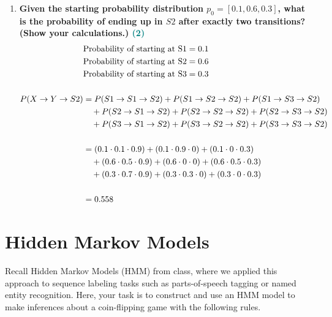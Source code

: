 \documentclass[a4paper]{article}
\begin{document}
\begin{sloppypar}
\begin{enumerate}[start=1,label=Q\arabic*,left=0pt]
    \item \textbf{Given the starting probability distribution $p_0 = [0.1, 0.6, 0.3]$, what is the probability of ending up in $S2$ after exactly two transitions? (Show your calculations.) \hfill \textcolor{teal}{(2)}}
    \begin{align*}
        & \hfill \text{Probability of starting at S1} \hfill = 0.1 \\
        & \hfill \text{Probability of starting at S2} \hfill = 0.6 \\
        & \hfill \text{Probability of starting at S3} \hfill = 0.3 \\\\
        P(X \rightarrow Y \rightarrow S2) &= P(S1 \rightarrow S1 \rightarrow S2) + P(S1 \rightarrow S2 \rightarrow S2) + P(S1 \rightarrow S3 \rightarrow S2) \\
        &\quad + P(S2 \rightarrow S1 \rightarrow S2) + P(S2 \rightarrow S2 \rightarrow S2) + P(S2 \rightarrow S3 \rightarrow S2) \\
        &\quad + P(S3 \rightarrow S1 \rightarrow S2) + P(S3 \rightarrow S2 \rightarrow S2) + P(S3 \rightarrow S3 \rightarrow S2) \\\\
        &= (0.1 \cdot 0.1 \cdot 0.9) + (0.1 \cdot  0.9 \cdot 0) + (0.1 \cdot 0 \cdot 0.3) \\
        &\quad + (0.6 \cdot 0.5 \cdot 0.9) + (0.6 \cdot 0 \cdot  0) + (0.6 \cdot 0.5 \cdot 0.3) \\
        &\quad + (0.3 \cdot 0.7 \cdot 0.9) + (0.3 \cdot 0.3 \cdot 0) + (0.3 \cdot 0 \cdot 0.3) \\\\
        &= 0.558
    \end{align*}

\end{enumerate}

\section{Hidden Markov Models}

Recall Hidden Markov Models (HMM) from class, where we applied this approach to sequence 
labeling tasks such as parts-of-speech tagging or named entity recognition. Here,
your task is to construct and use an HMM model to make inferences about a coin-flipping
game with the following rules. \\


\end{sloppypar}
\end{document}
